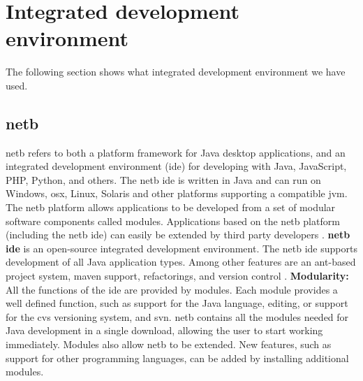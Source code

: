 \section{Integrated development environment}

The following section shows what integrated development environment we have used.

\subsection{\gls{netb}}
\gls{netb} refers to both a platform framework for Java desktop applications, and an integrated development environment (\gls{ide}) for developing with Java, JavaScript, PHP, Python, and others.
The \gls{netb} \gls{ide} is written in Java and can run on Windows, \gls{osx}, Linux, Solaris and other platforms supporting a compatible \gls{jvm}. 
\newline
\newline
The \gls{netb} platform allows applications to be developed from a set of modular software components called modules. Applications based on the \gls{netb} platform (including the \gls{netb} \gls{ide}) can easily be extended by third party developers \cite{bib:netbeans}.
\newline
\newline
\textbf{\gls{netb} \gls{ide}} is an open-source integrated development environment. The \gls{netb} \gls{ide} supports development of all Java application types. Among other features are an \gls{ant}-based project system, \gls{maven} support, refactorings, and version control \cite{bib:ide}.
\newline
\newline
\textbf{Modularity:} All the functions of the \gls{ide} are provided by modules. Each module provides a well defined function, such as support for the Java language, editing, or support for the \gls{cvs} versioning system, and \gls{svn}. \gls{netb} contains all the modules needed for Java development in a single download, allowing the user to start working immediately. Modules also allow \gls{netb} to be extended. New features, such as support for other programming languages, can be added by installing additional modules.